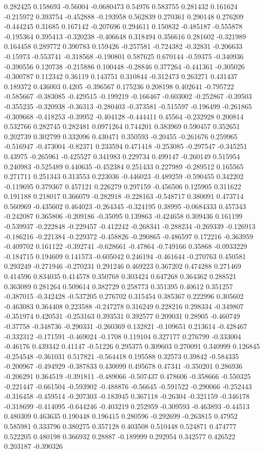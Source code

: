 0.282425 0.158693 -0.56004 -0.0680473 0.54976 0.583755 0.281432 0.161624 -0.215972 0.393754 -0.452888 -0.193958 0.562839 0.270361 0.290148 0.276209 -0.444245 0.31685 0.167142 -0.207696 0.294611 0.150832 -0.485187 -0.555878 -0.195364 0.395413 -0.320238 -0.406648 0.318494 0.356616 0.281602 -0.321989 0.164458 0.289772 0.390783 0.159426 -0.257581 -0.724382 -0.32831 -0.206633 -0.15973 -0.553741 -0.318568 -0.190801 0.587625 0.670144 -0.59375 -0.340936 -0.390556 0.120738 -0.215886 0.100448 -0.28846 0.377264 -0.441361 -0.305026 -0.300787 0.112342 0.36119 0.143751 0.310844 -0.312473 0.263271 0.431437 0.189372 0.436003 0.4205 -0.396567 0.175236 0.208198 0.402641 -0.795722 -0.585667 -0.383085 -0.429515 -0.199219 -0.166467 -0.603002 -0.252867 -0.39503 -0.355235 -0.320938 -0.36313 -0.280403 -0.373581 -0.515597 -0.196499 -0.261865 -0.309668 -0.418253 -0.39952 -0.404128 -0.444411 0.45564 -0.232928 0.200814 0.532766 0.282745 0.282481 0.0971264 0.744201 0.383969 0.590457 0.352651 0.202739 0.302799 0.332096 0.430471 0.350593 -0.20455 -0.261676 0.259965 -0.516947 -0.473004 -0.82371 0.233594 0.471418 -0.253085 -0.297547 -0.345251 0.43975 -0.265961 -0.425527 0.341983 0.229734 0.499147 -0.260149 0.515954 0.240983 -0.525489 0.440635 -0.452384 0.251433 0.227989 -0.289512 0.165565 0.271711 0.251343 0.313553 0.223036 -0.446023 -0.489259 -0.590455 0.342202 -0.119695 0.379367 0.457121 0.226279 0.297159 -0.456506 0.125905 0.311622 0.191188 0.218017 0.366079 -0.282918 -0.228163 -0.548717 0.380091 0.473714 0.560969 -0.435602 0.464023 -0.264345 -0.324195 0.38995 -0.0684333 0.457343 -0.242087 0.365806 -0.209186 -0.35095 0.139863 -0.424658 0.309436 0.161199 -0.539937 -0.222848 -0.229457 -0.412242 -0.268341 -0.288234 -0.269339 -0.126913 -0.186216 -0.221384 -0.229372 -0.458826 -0.290865 -0.486597 0.172216 -0.363959 -0.409702 0.161122 -0.392741 -0.628661 -0.47864 -0.749166 0.35868 -0.0933229 -0.184715 0.194609 0.141573 -0.605042 0.246194 -0.461644 -0.270763 0.450581 0.293249 -0.271946 -0.270231 0.291246 0.469223 0.367202 0.474288 0.271469 0.414596 0.834035 0.414578 0.350768 0.303424 0.647268 0.364362 0.288521 0.363089 0.281264 0.509614 0.382729 0.258773 0.351395 0.40612 0.351257 -0.387015 -0.342428 -0.537205 0.276702 0.315454 0.385367 0.222996 0.305602 -0.463083 0.364408 0.223588 -0.247278 0.316249 0.228216 0.298334 -0.349807 -0.351974 0.420531 -0.253163 0.393531 0.392577 0.209031 0.28905 -0.460749 -0.37758 -0.348736 -0.290331 -0.260369 0.132821 -0.109651 0.213614 -0.428467 -0.332312 -0.171591 -0.469024 -0.1708 0.119104 0.327177 0.276799 -0.333004 -0.46176 0.439342 0.41147 -0.51226 0.295375 0.309603 0.270091 0.340999 0.126845 -0.254548 -0.361031 0.517821 -0.564418 0.195588 0.32573 0.39842 -0.584335 -0.200967 -0.494929 -0.387833 0.430099 0.495678 0.47341 -0.350201 0.286936 -0.206291 0.364519 -0.391811 -0.489066 -0.507437 0.478606 -0.358666 -0.550325 -0.221447 -0.661504 -0.593902 -0.488876 -0.56645 -0.591522 -0.290066 -0.252443 -0.316458 -0.459514 -0.207303 -0.183945 0.367118 -0.26304 -0.321159 -0.346178 -0.318699 -0.414095 -0.644246 -0.403219 0.252959 -0.309593 -0.463893 -0.44513 0.480309 0.463635 0.190448 0.196415 0.280596 -0.292699 -0.263815 0.47952 0.585981 0.333796 0.380275 0.357128 0.403508 0.510448 0.524871 0.474777 0.522205 0.480198 0.366932 0.28887 -0.189999 0.292954 0.342577 0.426522 0.203187 -0.390326 